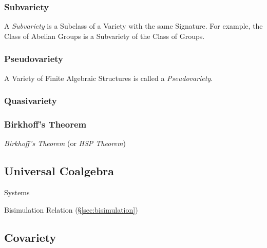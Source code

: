 \subsubsection{Subvariety}\label{sec:subvariety_theorem}

A \emph{Subvariety} is a Subclass of a Variety with the same
Signature. For example, the Class of Abelian Groups is a Subvariety of
the Class of Groups.



\subsubsection{Pseudovariety}\label{sec:pseudovariety}

A Variety of Finite Algebraic Structures is called a
\emph{Pseudovariety}.



\subsubsection{Quasivariety}\label{sec:quasivariety}



\subsubsection{Birkhoff's Theorem}\label{sec:birkhoffs_theorem}
\cite{birkhoff35}

\emph{Birkhoff's Theorem} (or \emph{HSP Theorem})



\subsection{Universal Coalgebra}\label{sec:universal_coalgebra}

\cite{rutten00}

Systems

Bisimulation Relation (\S\ref{sec:bisimulation})



\subsection{Covariety}\label{sec:covariety}



